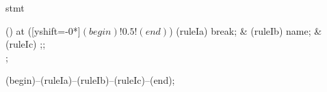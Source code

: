 \begin{syntax}{stmt}
  
  \node[sequence] () at ([yshift=-0*\syntaxruledist]$(begin)!0.5!(end)$) {
    \node[terminal]    (ruleIa) {break};
    &
    \node[nonterminal] (ruleIb) {name};
    &
    \node[terminal]    (ruleIc) {;};
    \\
  };
  
  \draw[path] (begin)--(ruleIa)--(ruleIb)--(ruleIc)--(end);
\end{syntax}
